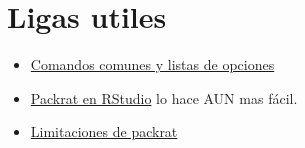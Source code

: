 \documentclass[]{article}
\providecommand{\tightlist}{%
  \setlength{\itemsep}{0pt}\setlength{\parskip}{0pt}}
\begin{document}
\section{Ligas utiles}\label{ligas-utiles}

\begin{itemize}
\tightlist
\item
  \href{https://rstudio.github.io/packrat/commands.html}{Comandos
  comunes y listas de opciones}
\item
  \href{https://rstudio.github.io/packrat/rstudio.html}{Packrat en
  RStudio} lo hace AUN mas fácil.
\item
  \href{https://rstudio.github.io/packrat/limitations.html}{Limitaciones
  de packrat}
\end{itemize}
\end{document}
